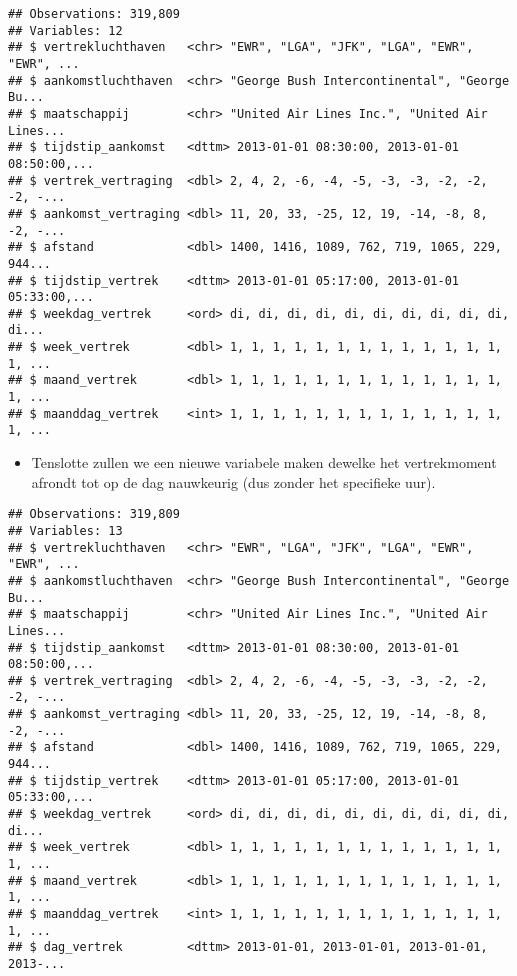 \documentclass[]{memoir}
\newenvironment{Shaded}{\begin{snugshade}}{\end{snugshade}}
\newcommand{\KeywordTok}[1]{\textcolor[rgb]{0.13,0.29,0.53}{\textbf{#1}}}
\newcommand{\DataTypeTok}[1]{\textcolor[rgb]{0.13,0.29,0.53}{#1}}
\newcommand{\StringTok}[1]{\textcolor[rgb]{0.31,0.60,0.02}{#1}}
\newcommand{\OperatorTok}[1]{\textcolor[rgb]{0.81,0.36,0.00}{\textbf{#1}}}
\newcommand{\NormalTok}[1]{#1}
\providecommand{\tightlist}{%
  \setlength{\itemsep}{0pt}\setlength{\parskip}{0pt}}
\begin{document}
\begin{verbatim}
## Observations: 319,809
## Variables: 12
## $ vertrekluchthaven   <chr> "EWR", "LGA", "JFK", "LGA", "EWR", "EWR", ...
## $ aankomstluchthaven  <chr> "George Bush Intercontinental", "George Bu...
## $ maatschappij        <chr> "United Air Lines Inc.", "United Air Lines...
## $ tijdstip_aankomst   <dttm> 2013-01-01 08:30:00, 2013-01-01 08:50:00,...
## $ vertrek_vertraging  <dbl> 2, 4, 2, -6, -4, -5, -3, -3, -2, -2, -2, -...
## $ aankomst_vertraging <dbl> 11, 20, 33, -25, 12, 19, -14, -8, 8, -2, -...
## $ afstand             <dbl> 1400, 1416, 1089, 762, 719, 1065, 229, 944...
## $ tijdstip_vertrek    <dttm> 2013-01-01 05:17:00, 2013-01-01 05:33:00,...
## $ weekdag_vertrek     <ord> di, di, di, di, di, di, di, di, di, di, di...
## $ week_vertrek        <dbl> 1, 1, 1, 1, 1, 1, 1, 1, 1, 1, 1, 1, 1, 1, ...
## $ maand_vertrek       <dbl> 1, 1, 1, 1, 1, 1, 1, 1, 1, 1, 1, 1, 1, 1, ...
## $ maanddag_vertrek    <int> 1, 1, 1, 1, 1, 1, 1, 1, 1, 1, 1, 1, 1, 1, ...
\end{verbatim}

\begin{itemize}
\tightlist
\item
  Tenslotte zullen we een nieuwe variabele maken dewelke het
  vertrekmoment afrondt tot op de dag nauwkeurig (dus zonder het
  specifieke uur).
\end{itemize}

\begin{Shaded}
\end{Shaded}

\begin{verbatim}
## Observations: 319,809
## Variables: 13
## $ vertrekluchthaven   <chr> "EWR", "LGA", "JFK", "LGA", "EWR", "EWR", ...
## $ aankomstluchthaven  <chr> "George Bush Intercontinental", "George Bu...
## $ maatschappij        <chr> "United Air Lines Inc.", "United Air Lines...
## $ tijdstip_aankomst   <dttm> 2013-01-01 08:30:00, 2013-01-01 08:50:00,...
## $ vertrek_vertraging  <dbl> 2, 4, 2, -6, -4, -5, -3, -3, -2, -2, -2, -...
## $ aankomst_vertraging <dbl> 11, 20, 33, -25, 12, 19, -14, -8, 8, -2, -...
## $ afstand             <dbl> 1400, 1416, 1089, 762, 719, 1065, 229, 944...
## $ tijdstip_vertrek    <dttm> 2013-01-01 05:17:00, 2013-01-01 05:33:00,...
## $ weekdag_vertrek     <ord> di, di, di, di, di, di, di, di, di, di, di...
## $ week_vertrek        <dbl> 1, 1, 1, 1, 1, 1, 1, 1, 1, 1, 1, 1, 1, 1, ...
## $ maand_vertrek       <dbl> 1, 1, 1, 1, 1, 1, 1, 1, 1, 1, 1, 1, 1, 1, ...
## $ maanddag_vertrek    <int> 1, 1, 1, 1, 1, 1, 1, 1, 1, 1, 1, 1, 1, 1, ...
## $ dag_vertrek         <dttm> 2013-01-01, 2013-01-01, 2013-01-01, 2013-...
\end{verbatim}
\end{document}

